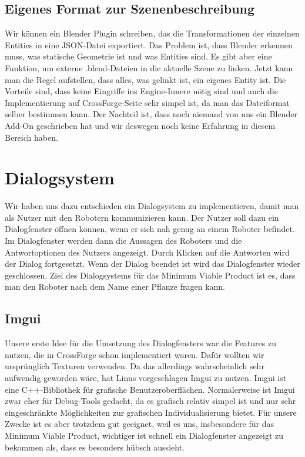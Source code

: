 \subsection{Eigenes Format zur Szenenbeschreibung}

Wir können ein Blender Plugin schreiben, das die Transformationen der einzelnen Entities in eine JSON-Datei exportiert. Das Problem ist, dass Blender erkennen muss, was statische Geometrie ist und was Entities sind. Es gibt aber eine Funktion, um externe .blend-Dateien in die aktuelle Szene zu linken. Jetzt kann man die Regel aufstellen, dass alles, was gelinkt ist, ein eigenes Entity ist. Die Vorteile sind, dass keine Eingriffe ins Engine-Innere nötig sind und auch die Implementierung auf CrossForge-Seite sehr simpel ist, da man das Dateiformat selber bestimmen kann. Der Nachteil ist, dass noch niemand von uns ein Blender Add-On geschrieben hat und wir deswegen noch keine Erfahrung in diesem Bereich haben.

\section{Dialogsystem}

Wir haben uns dazu entschieden ein Dialogsystem zu implementieren, damit man als Nutzer mit den Robotern kommunizieren kann. Der Nutzer soll dazu ein Dialogfenster öffnen können, wenn er sich nah genug an einem Roboter befindet. Im Dialogfenster werden dann die Aussagen des Roboters und die Antwortoptionen des Nutzers angezeigt. Durch Klicken auf die Antworten wird der Dialog fortgesetzt. Wenn der Dialog beendet ist wird das Dialogfenster wieder geschlossen. Ziel des Dialogsystems für das Minimum Viable Product ist es, dass man den Roboter nach dem Name einer Pflanze fragen kann. 

\subsection{Imgui}

Unsere erste Idee für die Umsetzung des Dialogfensters war die Features zu nutzen, die in CrossForge schon implementiert waren. Dafür wollten wir ursprünglich Texturen verwenden. Da das allerdings wahrscheinlich sehr aufwendig geworden wäre, hat Linus vorgeschlagen Imgui zu nutzen.
Imgui ist eine C++-Bibliothek für grafische Benutzeroberflächen. Normalerweise ist Imgui zwar eher für Debug-Tools gedacht, da es grafisch relativ simpel ist und nur sehr eingeschränkte Möglichkeiten zur grafischen Individualisierung bietet. Für unsere Zwecke ist es aber trotzdem gut geeignet, weil es uns, insbesondere für das Minimum Viable Product, wichtiger ist schnell ein Dialogfenster angezeigt zu bekommen als, dass es besonders hübsch aussieht. 

